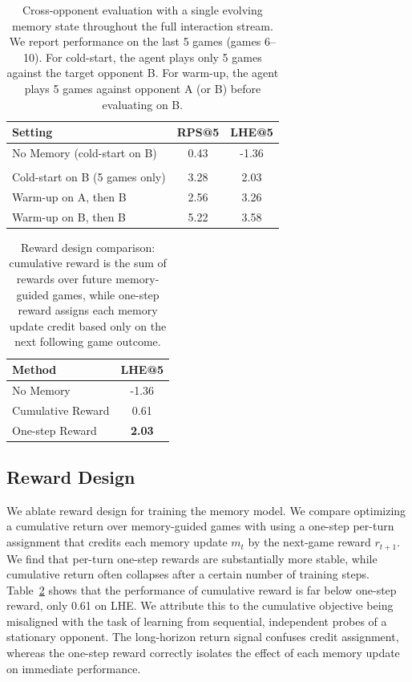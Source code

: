 \documentclass{article}
\newcommand{\methodname}{MemoPilot}
\newcommand{\method}{\textsc{\methodname}}
\theoremstyle{plain}
\theoremstyle{definition}
\theoremstyle{remark}
\begin{document}
\begin{table}[t]
\centering
\caption{Cross-opponent evaluation with a single evolving memory state throughout the full interaction stream. We report performance on the last 5 games (games 6--10). For cold-start, the agent plays only 5 games against the target opponent B. For warm-up, the agent plays 5 games against opponent A (or B) before evaluating on B.}
\label{tab:cross_opponent}
\small
\begin{tabular}{lcc}
\toprule
\textbf{Setting} & \textbf{RPS@5}  & \textbf{LHE@5} \\
\midrule
No Memory (cold-start on B) & 0.43 & -1.36 \\
\midrule
\rowcolor{gray!10} \multicolumn{3}{l}{\textit{Memory w/ \method{}}} \\
Cold-start on B (5 games only) & 3.28 & 2.03 \\
Warm-up on A, then B & 2.56 & 3.26 \\
Warm-up on B, then B & 5.22 & 3.58 \\
\bottomrule
\end{tabular}
\end{table}

\begin{table}[t]
\centering
\caption{Reward design comparison: cumulative reward is the sum of rewards over future memory-guided games, while one-step reward assigns each memory update credit based only on the next following game outcome.}
\small
\label{tab:reward_design}
\begin{tabular}{lc}
\toprule
\textbf{Method}   & \textbf{LHE@5} \\
\midrule
No Memory & -1.36  \\
 Cumulative Reward & 0.61 \\
 One-step Reward& \textbf{2.03}\\
\bottomrule
\end{tabular}
\end{table}

\subsection{Reward Design}
We ablate reward design for training the memory model. We compare optimizing a cumulative return over memory-guided games with using a one-step per-turn assignment that credits each memory update $m_t$ by the next-game reward $r_{t+1}$. We find that per-turn one-step rewards are substantially more stable, while cumulative return often collapses after a certain number of training steps. Table~\ref{tab:reward_design} shows that the performance of cumulative reward is far below one-step reward, only 0.61 on LHE. We attribute this to the cumulative objective being misaligned with the task of learning from sequential, independent probes of a stationary opponent. The long-horizon return signal confuses credit assignment, whereas the one-step reward correctly isolates the effect of each memory update on immediate performance.
\end{document}
